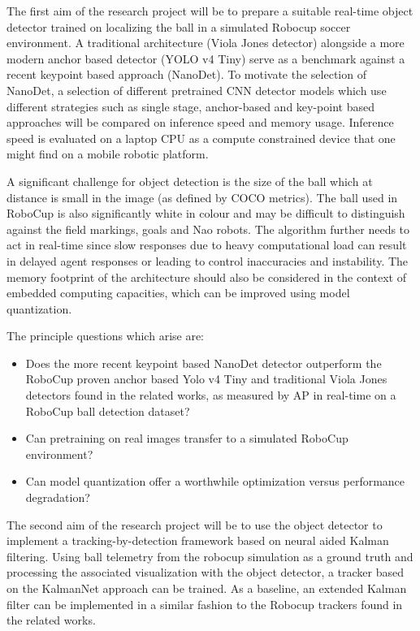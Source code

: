 \documentclass[a4paper,twoside,12pt]{report}
\begin{document}
The first aim of the research project will be to prepare a suitable real-time object detector trained on localizing the ball in a simulated Robocup soccer environment. A traditional architecture (Viola Jones detector) alongside a more modern anchor based detector (YOLO v4 Tiny) serve as a benchmark against a recent keypoint based approach (NanoDet). To motivate the selection of NanoDet, a selection of different pretrained CNN detector models which use different strategies such as single stage, anchor-based and key-point based approaches will be compared on inference speed and memory usage. Inference speed is evaluated on a laptop CPU as a compute constrained device that one might find on a mobile robotic platform. 

A significant challenge for object detection is the size of the ball which at distance is small in the image (as defined by COCO metrics). The ball used in RoboCup is also significantly white in colour and may be difficult to distinguish against the field markings, goals and Nao robots. The algorithm further needs to act in real-time since slow responses due to heavy computational load can result in delayed agent responses or leading to control inaccuracies and instability. The memory footprint of the architecture should also be considered in the context of embedded computing capacities, which can be improved using model quantization.

The principle questions which arise are:
\begin{itemize}
    \item Does the more recent keypoint based NanoDet detector outperform the RoboCup proven anchor based Yolo v4 Tiny and traditional Viola Jones detectors found in the related works, as measured by AP in real-time on a RoboCup ball detection dataset? 
    \item Can pretraining on real images transfer to a simulated RoboCup environment?
    \item Can model quantization offer a worthwhile optimization versus performance degradation? 
\end{itemize}

The second aim of the research project will be to use the object detector to implement a tracking-by-detection framework based on neural aided Kalman filtering. Using ball telemetry from the robocup simulation as a ground truth and processing the associated visualization with the object detector, a tracker based on the KalmanNet approach can be trained. As a baseline, an extended Kalman filter can be implemented in a similar fashion to the Robocup trackers found in the related works. 
\end{document}
